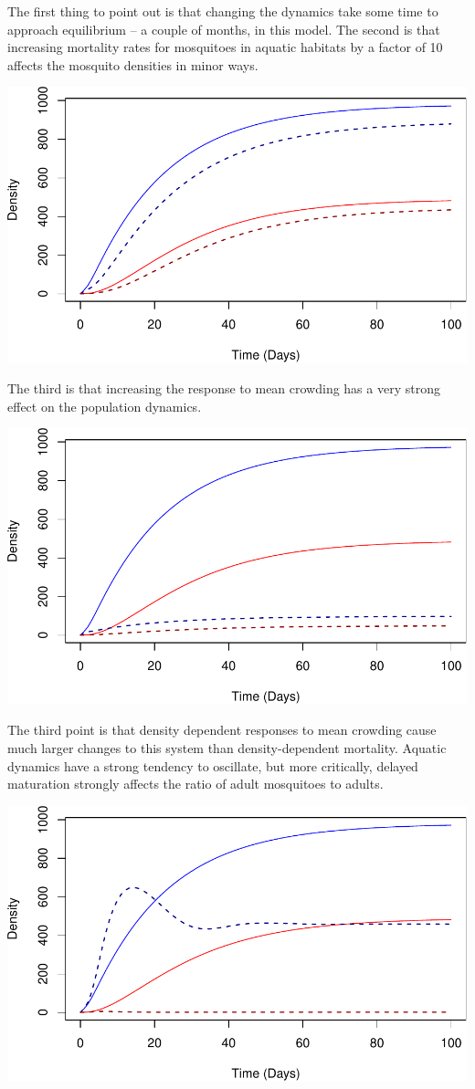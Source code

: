 \documentclass[
]{book}
\begin{document}
The first thing to point out is that changing the dynamics take some time to approach equilibrium -- a couple of months, in this model. The second is that increasing mortality rates for mosquitoes in aquatic habitats by a factor of 10 affects the mosquito densities in minor ways.

\includegraphics{docs/figs/unnamed-chunk-90-1.pdf}

The third is that increasing the response to mean crowding has a very strong effect on the population dynamics.

\includegraphics{docs/figs/unnamed-chunk-91-1.pdf}

The third point is that density dependent responses to mean crowding cause much larger changes to this system than density-dependent mortality. Aquatic dynamics have a strong tendency to oscillate, but more critically, delayed maturation strongly affects the ratio of adult mosquitoes to adults.

\includegraphics{docs/figs/compareML-1.pdf}
\end{document}
